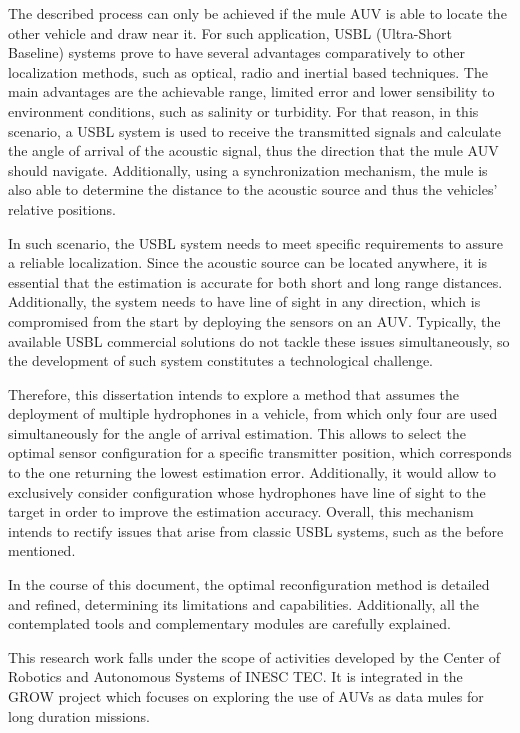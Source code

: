 The described process can only be achieved if the mule AUV is able to locate the other vehicle and draw near it. For such application, USBL (Ultra-Short Baseline) systems prove to have several advantages comparatively to other localization methods, such as optical, radio and inertial based techniques. The main advantages are the achievable range, limited error and lower sensibility to environment conditions, such as salinity or turbidity. For that reason, in this scenario, a USBL system is used to receive the transmitted signals and calculate the angle of arrival of the acoustic signal, thus the direction that the mule AUV should navigate. Additionally, using a synchronization mechanism, the mule is also able to determine the distance to the acoustic source and thus the vehicles' relative positions.

In such scenario, the USBL system needs to meet specific requirements to assure a reliable localization. Since the acoustic source can be located anywhere, it is essential that the estimation is accurate for both short and long range distances. Additionally, the system needs to have line of sight in any direction, which is compromised from the start by deploying the sensors on an AUV. Typically, the available USBL commercial solutions do not tackle these issues simultaneously, so the development of such system constitutes a technological challenge.

Therefore, this dissertation intends to explore a method that assumes the deployment of multiple hydrophones in a vehicle, from which only four are used simultaneously for the angle of arrival estimation. This allows to select the optimal sensor configuration for a specific transmitter position, which corresponds to the one returning the lowest estimation error. Additionally, it would allow to exclusively consider configuration whose hydrophones have line of sight to the target in order to improve the estimation accuracy. Overall, this mechanism intends to rectify issues that arise from classic USBL systems, such as the before mentioned. 

In the course of this document, the optimal reconfiguration method is detailed and refined, determining its limitations and capabilities. Additionally, all the contemplated tools and complementary modules are carefully explained.

This research work falls under the scope of activities developed by the Center of Robotics and Autonomous Systems of INESC TEC. It is integrated in the GROW project which focuses on exploring the use of AUVs as data mules for long duration missions.


